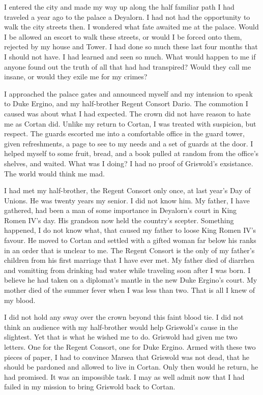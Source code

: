 \documentclass{article}
\begin{document}
I entered the city and made my way up along the half familiar path I had traveled a year ago to the palace a Deyalorn. I had not had the opportunity to walk the city streets then. I wondered what fate awaited me at the palace. Would I be allowed an escort to walk these streets, or would I be forced onto them, rejected by my house and Tower. I had done so much these last four months that I should not have. I had learned and seen so much. What would happen to me if anyone found out the truth of all that had had transpired? Would they call me insane, or would they exile me for my crimes?

I approached the palace gates and announced myself and my intension to speak to Duke Ergino, and my half-brother Regent Consort Dario. The commotion I caused was about what I had expected. The crown did not have reason to hate me as Cortan did. Unlike my return to Cortan, I was treated with suspicion, but respect. The guards escorted me into a comfortable office in the guard tower, given refreshments, a page to see to my needs and a set of guards at the door. I helped myself to some fruit, bread, and a book pulled at random from the office's shelves, and waited. What was I doing? I had no proof of Griswold's exsistance. The world would think me mad.

I had met my half-brother, the Regent Consort only once, at last year's Day of Unions. He was twenty years my senior. I did not know him. My father, I have gathered, had been a man of some importance in Deyalorn's court in King Romen IV's day. His grandson now held the country's scepter. Something happened, I do not know what, that caused my father to loose King Romen IV's favour. He moved to Cortan and settled with a gifted woman far below his ranks in an order that is unclear to me. The Regent Consort is the only of my father's children from his first marriage that I have ever met. My father died of diarrhea and vomitting from drinking bad water while traveling soon after I was born. I believe he had taken on a diplomat's mantle in the new Duke Ergino's court. My mother died of the summer fever when I was less than two. That is all I knew of my blood.

I did not hold any sway over the crown beyond this faint blood tie. I did not think an audience with my half-brother would help Griswold's cause in the slightest. Yet that is what he wished me to do. Griswold had given me two letters. One for the Regent Consort, one for Duke Ergino. Armed with these two pieces of paper, I had to convince Marsea that Griswold was not dead, that he should be pardoned and allowed to live in Cortan. Only then would he return, he had promised. It was an impossible task. I may as well admit now that I had failed in my mission to bring Griswold back to Cortan.
\end{document}
